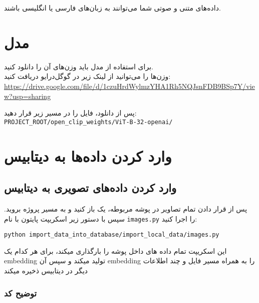 \documentclass{article}
\begin{document}
داده‌های متنی و صوتی شما می‌توانند به زبان‌های فارسی یا انگلیسی باشند.




\section{مدل }
برای استفاده از مدل  باید وزن‌های آن را دانلود کنید. \\
وزن‌ها را می‌توانید از لینک زیر در گوگل‌درایو دریافت کنید: \\[3pt]
\href{https://drive.google.com/file/d/1czuHrdWylmzYHA1Rh5NQJsnFDB9BSp7Y/view?usp=sharing}{\url{https://drive.google.com/file/d/1czuHrdWylmzYHA1Rh5NQJsnFDB9BSp7Y/view?usp=sharing}}

\vspace{6pt}
پس از دانلود، فایل را در مسیر زیر قرار دهید: \\[3pt]
\texttt{PROJECT\_ROOT/open\_clip\_weights/ViT-B-32-openai/}




\section{وارد کردن داده‌ها به دیتابیس}

\subsection{وارد کردن داده‌های تصویری به دیتابیس}

پس از قرار دادن تمام تصاویر در پوشه مربوطه، یک  باز کنید و به مسیر پروژه بروید.  
سپس با دستور زیر اسکریپت پایتون با نام \texttt{images.py} را اجرا کنید:

\begin{latin}
\begin{lstlisting}
python import_data_into_database/import_local_data/images.py
\end{lstlisting}
\end{latin}

این اسکریپت تمام داده های داخل پوشه  را بارگذاری میکند، برای هر کدام یک embedding تولید میکند و سپس آن embedding را به همراه مسیر فایل و چند اطلاعات دیگر در دیتابیس ذخیره میکند

\subsubsection*{توضیح کد}
\end{document}
